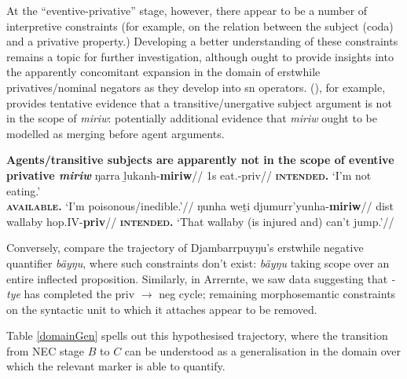 At the ``eventive-privative'' stage, however, there appear to be a number of interpretive constraints (for example, on the relation between the subject (coda) and a privative property.) Developing a better understanding of these constraints remains a topic for further investigation, although ought to provide insights into the apparently concomitant expansion in the domain of erstwhile privatives/nominal negators as they develop into \acrshort{sn} operators. 
(\nextx), for example, provides tentative evidence that a transitive/unergative subject argument is not in the scope of \textdblhyphen\textit{miriw}: potentially additional evidence that \textdblhyphen\textit{miriw} ought to be modelled as merging before agent arguments.


\pex\textbf{Agents/transitive subjects are apparently not in the scope of eventive privative \textdblhyphen\textit{miriw}}
\a\begingl\gla \ljudge{$ ^\# $}ŋarra ḻukanh-\textbf{miriw}//
\glb 1s eat.\IV-\gls{priv}//
\glft \textbf{\textsc{intended.}} `I'm not eating.'\\
\textbf{\textsc{available.}} `I'm poisonous/inedible.'\trailingcitation{[AW~20190502]}//
\endgl
\a\begingl\gla \ljudge{*}ŋunha weṯi djumurr'yunha-\textbf{miriw}//
\glb \gls{dist} wallaby hop.\gls{IV}-\textbf{\gls{priv}}//
\glft\textbf{\textsc{intended.}} `That wallaby (is injured and) can't jump.'//\endgl
\xe

Conversely, compare the trajectory of Djambarrpuyŋu's erstwhile negative quantifier \textit{bäyŋu}, where such constraints don't exist: \textit{bäyŋu} taking scope over an entire inflected proposition. Similarly, in Arrernte, we saw data suggesting that \textit{-tye} has completed the \gls{priv} $ \to $ \gls{neg} cycle; remaining morphosemantic constraints on the syntactic unit to which it attaches appear to be removed. 


\iffalse Table \ref{domainGen} spells out this hypothesised trajectory, where the transition from NEC stage $ B $ to $ C $ can be understood as a generalisation in the domain over which the relevant marker is able to quantify.

